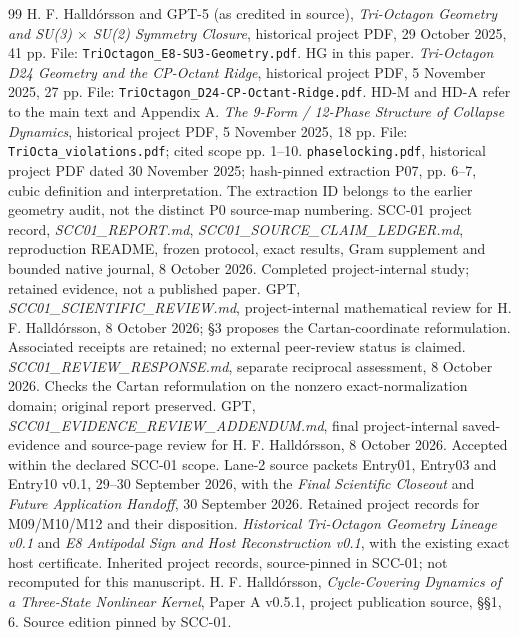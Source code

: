 \documentclass[11pt,a4paper]{article}
\numberwithin{equation}{section}
\begin{document}
\begin{thebibliography}{99}\small
{} H. F. Halldórsson and GPT-5 (as credited in source), \emph{Tri-Octagon Geometry and SU(3) $\times$ SU(2) Symmetry Closure}, historical project PDF, 29 October 2025, 41 pp. File: \texttt{TriOctagon\_E8-SU3-Geometry.pdf}. HG in this paper.
 \emph{Tri-Octagon D24 Geometry and the CP-Octant Ridge}, historical project PDF, 5 November 2025, 27 pp. File: \texttt{TriOctagon\_D24-CP-Octant-Ridge.pdf}. HD-M and HD-A refer to the main text and Appendix A.
 \emph{The 9-Form / 12-Phase Structure of Collapse Dynamics}, historical project PDF, 5 November 2025, 18 pp. File: \texttt{TriOcta\_violations.pdf}; cited scope pp. 1--10.
 \texttt{phaselocking.pdf}, historical project PDF dated 30 November 2025; hash-pinned extraction P07, pp. 6--7, cubic definition and interpretation. The extraction ID belongs to the earlier geometry audit, not the distinct P0 source-map numbering.
 SCC-01 project record, \emph{SCC01\_REPORT.md}, \emph{SCC01\_SOURCE\_CLAIM\_LEDGER.md}, reproduction README, frozen protocol, exact results, Gram supplement and bounded native journal, 8 October 2026. Completed project-internal study; retained evidence, not a published paper.
 GPT, \emph{SCC01\_SCIENTIFIC\_REVIEW.md}, project-internal mathematical review for H. F. Halldórsson, 8 October 2026; \S3 proposes the Cartan-coordinate reformulation. Associated receipts are retained; no external peer-review status is claimed.
 \emph{SCC01\_REVIEW\_RESPONSE.md}, separate reciprocal assessment, 8 October 2026. Checks the Cartan reformulation on the nonzero exact-normalization domain; original report preserved.
 GPT, \emph{SCC01\_EVIDENCE\_REVIEW\_ADDENDUM.md}, final project-internal saved-evidence and source-page review for H. F. Halldórsson, 8 October 2026. Accepted within the declared SCC-01 scope.
 Lane-2 source packets Entry01, Entry03 and Entry10 v0.1, 29--30 September 2026, with the \emph{Final Scientific Closeout} and \emph{Future Application Handoff}, 30 September 2026. Retained project records for M09/M10/M12 and their disposition.
 \emph{Historical Tri-Octagon Geometry Lineage v0.1} and \emph{E8 Antipodal Sign and Host Reconstruction v0.1}, with the existing exact host certificate. Inherited project records, source-pinned in SCC-01; not recomputed for this manuscript.
 H. F. Halldórsson, \emph{Cycle-Covering Dynamics of a Three-State Nonlinear Kernel}, Paper A v0.5.1, project publication source, \S\S1, 6. Source edition pinned by SCC-01.

\end{thebibliography}
\end{document}
